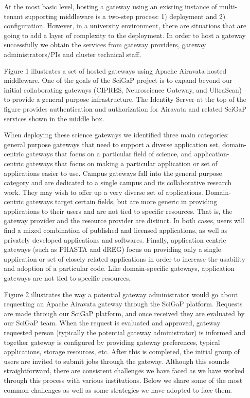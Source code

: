 \documentclass[sigconf]{acmart}
\begin{document}
At the most basic level, hosting a gateway using an existing instance of multi-tenant supporting middleware is a two-step process: 1) deployment and 2) configuration.  However, in a university environment, there are situations that are going to add a layer of complexity to the deployment. In order to host a gateway successfully we obtain the services from gateway providers, gateway administrators/PIs and cluster technical staff.

Figure 1 illustrates a set of hosted gateways using Apache Airavata hosted middleware. One of the goals of the SciGaP project is to expand beyond our initial collaborating gateways (CIPRES, Neuroscience Gateway, and UltraScan) to provide a general purpose infrastructure.  The Identity Server \cite{nakandala2016apache} at the top of the figure provides authentication and authorization for Airavata and related SciGaP services shown in the middle box.

When deploying these science gateways we identified three main categories:  general purpose gateways that need to support a diverse application set, domain-centric gateways that focus on a particular field of science, and application-centric gateways that focus on making a particular application or set of applications easier to use. Campus gateways fall into the general purpose category and are dedicated to a single campus and its collaborative research work. They may wish to offer up a very diverse set of applications.  Domain-centric gateways target  certain fields, but are more generic in providing applications to their users and are not tied to specific resources. That is, the gateway provider and the resource provider are distinct. In both cases, users will find a mixed combination of published and licensed applications, as well as privately developed applications and softwares. Finally, application centric gateways (such as PHASTA and dREG) focus on providing only a single application or set of closely related applications in order to increase the usability and adoption of a particular code. Like domain-specific gateways, application gateways are not tied to specific resources.

Figure 2 illustrates the way a potential gateway administrator would go about requesting an Apache Airavata gateway through the SciGaP platform.  Requests are made through our SciGaP platform, and once received they are evaluated by our SciGaP team.  When the request is evaluated and  approved, gateway requested person  (typically the potential gateway administrator) is informed and together gateway is configured by providing gateway preferences, typical applications, storage resources, etc.  After this is completed, the initial group of users are invited to submit jobs through the gateway.  Although this sounds straightforward, there are consistent challenges we have faced as we have worked through this process with various institutions.  Below we share some of the most common challenges as well as some strategies we have adopted to face them.
\end{document}
